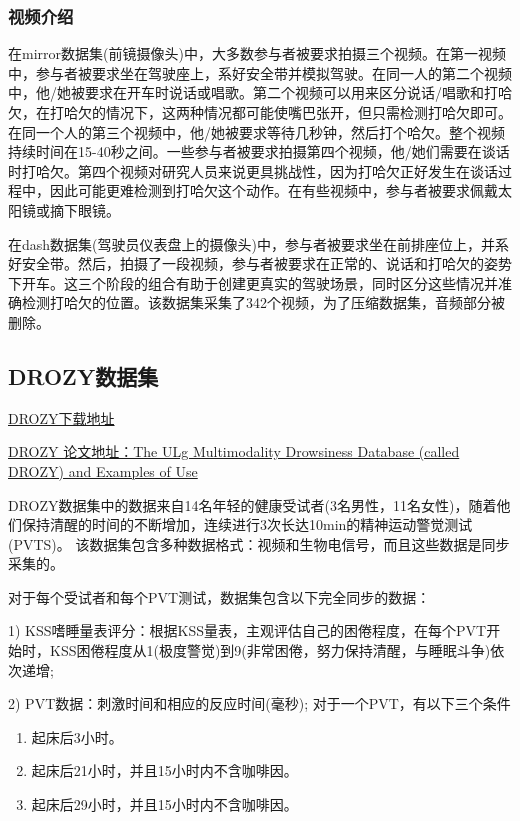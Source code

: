 \subsubsection{视频介绍}

在mirror数据集(前镜摄像头)中，大多数参与者被要求拍摄三个视频。在第一视频中，参与者被要求坐在驾驶座上，系好安全带并模拟驾驶。在同一人的第二个视频中，他/她被要求在开车时说话或唱歌。第二个视频可以用来区分说话/唱歌和打哈欠，在打哈欠的情况下，这两种情况都可能使嘴巴张开，但只需检测打哈欠即可。在同一个人的第三个视频中，他/她被要求等待几秒钟，然后打个哈欠。整个视频持续时间在15-40秒之间。一些参与者被要求拍摄第四个视频，他/她们需要在谈话时打哈欠。第四个视频对研究人员来说更具挑战性，因为打哈欠正好发生在谈话过程中，因此可能更难检测到打哈欠这个动作。在有些视频中，参与者被要求佩戴太阳镜或摘下眼镜。

在dash数据集(驾驶员仪表盘上的摄像头)中，参与者被要求坐在前排座位上，并系好安全带。然后，拍摄了一段视频，参与者被要求在正常的、说话和打哈欠的姿势下开车。这三个阶段的组合有助于创建更真实的驾驶场景，同时区分这些情况并准确检测打哈欠的位置。该数据集采集了342个视频，为了压缩数据集，音频部分被删除。

\subsection{DROZY数据集}
\href{https://orbi.uliege.be/handle/2268/191620}{DROZY下载地址}

\href{http://www.drozy.ulg.ac.be/application/files/2814/5847/3536/2016Massoz.pdf}{DROZY 论文地址：The ULg Multimodality Drowsiness Database (called DROZY) and Examples of Use}

DROZY数据集中的数据来自14名年轻的健康受试者(3名男性，11名女性)，随着他们保持清醒的时间的不断增加，连续进行3次长达10min的精神运动警觉测试(PVTS)。 该数据集包含多种数据格式：视频和生物电信号，而且这些数据是同步采集的。

对于每个受试者和每个PVT测试，数据集包含以下完全同步的数据：

1) KSS嗜睡量表评分：根据KSS量表，主观评估自己的困倦程度，在每个PVT开始时，KSS困倦程度从1(极度警觉)到9(非常困倦，努力保持清醒，与睡眠斗争)依次递增;

2) PVT数据：刺激时间和相应的反应时间(毫秒); 对于一个PVT，有以下三个条件
\begin{enumerate}[label=\circled{\arabic*}]
    \item 起床后3小时。
    \item 起床后21小时，并且15小时内不含咖啡因。
    \item 起床后29小时，并且15小时内不含咖啡因。
\end{enumerate}

